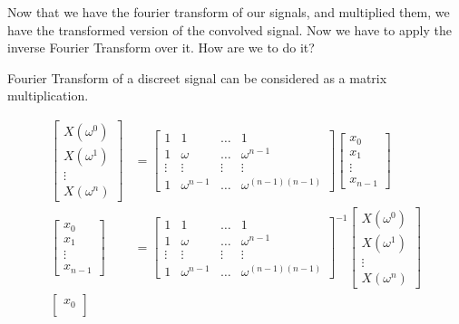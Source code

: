 \documentclass[12pt]{article}
\begin{document}
Now that we have the fourier transform of our signals, and multiplied them, we have the transformed version of the convolved signal. Now we have to apply the inverse Fourier Transform over it. How are we to do it?

Fourier Transform of a discreet signal can be considered as a matrix multiplication.


\begin{align*}
\begin{bmatrix}
    X(\omega^0)\\
    X(\omega^1)\\
    \vdots\\
    X(\omega^n)
\end{bmatrix} 
    &=
\begin{bmatrix}
    1      & 1      & \dots  & 1\\
    1      & \omega & \dots  & \omega^{n-1}\\
    \vdots & \vdots & \vdots & \vdots\\
    1      & \omega^{n-1} & \dots & \omega^{(n-1)(n-1)}
\end{bmatrix}
\begin{bmatrix}
    x_0\\
    x_1\\
    \vdots\\
    x_{n-1}
\end{bmatrix}\\
\begin{bmatrix}
    x_0\\
    x_1\\
    \vdots\\
    x_{n-1}
\end{bmatrix}
    &=
\begin{bmatrix}
    1      & 1      & \dots  & 1\\
    1      & \omega & \dots  & \omega^{n-1}\\
    \vdots & \vdots & \vdots & \vdots\\
    1      & \omega^{n-1} & \dots & \omega^{(n-1)(n-1)}
\end{bmatrix}^{-1}
\begin{bmatrix}
    X(\omega^0)\\
    X(\omega^1)\\
    \vdots\\
    X(\omega^n)
\end{bmatrix}\\
\begin{bmatrix}
    x_0\\

\end{bmatrix}
\end{align*}
\end{document}
